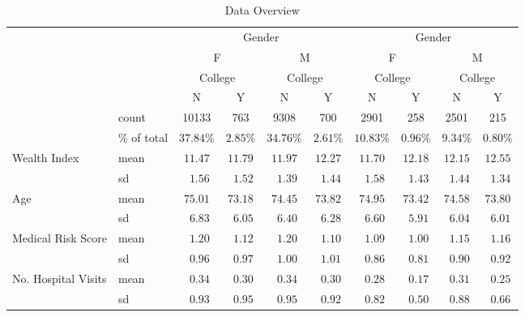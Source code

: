\documentclass[english, 12pt]{article}
\begin{document}
\begin{table}
{\begin{tabular}{llcccccccc}
& & \multicolumn{4}{c}{Gender} & \multicolumn{4}{c}{Gender} \\ \cmidrule(lr){3-6}\cmidrule(lr){7-10}
& & \multicolumn{2}{c}{F} & \multicolumn{2}{c}{M} & \multicolumn{2}{c}{F} & \multicolumn{2}{c}{M} \\ \cmidrule(lr){3-4}\cmidrule(lr){5-6}\cmidrule(lr){7-8}\cmidrule(lr){9-10}
& & \multicolumn{2}{c}{College} & \multicolumn{2}{c}{College} & \multicolumn{2}{c}{College} & \multicolumn{2}{c}{College} \\ \cmidrule(lr){3-4}\cmidrule(lr){5-6}\cmidrule(lr){7-8}\cmidrule(lr){9-10}
 &  & N & Y & N & Y & N & Y & N & \multicolumn{1}{c}{Y} \\ 
\midrule
& count & 10133 & 763 & 9308 & 700 & 2901 & 258 & 2501 & 215 \\
 & \% of total & $37.84\%$ & $2.85\%$ & $34.76\%$ & $2.61\%$ & $10.83\%$ & $0.96\%$ & $9.34\%$ & $0.80\%$ \\
Wealth Index & mean  & $11.47$ & $11.79$ & $11.97$ & $12.27$ & $11.70$ & $12.18$ & $12.15$ & $12.55$ \\
 & sd & $\phantom{0}1.56$ & $\phantom{0}1.52$ & $\phantom{0}1.39$ & $\phantom{0}1.44$ & $\phantom{0}1.58$ & $\phantom{0}1.43$ & $\phantom{0}1.44$ & $\phantom{0}1.34$ \\
Age & mean  & $75.01$ & $73.18$ & $74.45$ & $73.82$ & $74.95$ & $73.42$ & $74.58$ & $73.80$ \\
 & sd  & $\phantom{0}6.83$ & $\phantom{0}6.05$ & $\phantom{0}6.40$ & $\phantom{0}6.28$ & $\phantom{0}6.60$ & $\phantom{0}5.91$ & $\phantom{0}6.04$ & $\phantom{0}6.01$ \\
 Medical Risk Score & mean  & $\phantom{0}1.20$ & $\phantom{0}1.12$ & $\phantom{0}1.20$ & $\phantom{0}1.10$ & $\phantom{0}1.09$ & $\phantom{0}1.00$ & $\phantom{0}1.15$ & $\phantom{0}1.16$ \\
 & sd  & $\phantom{0}0.96$ & $\phantom{0}0.97$ & $\phantom{0}1.00$ & $\phantom{0}1.01$ & $\phantom{0}0.86$ & $\phantom{0}0.81$ & $\phantom{0}0.90$ & $\phantom{0}0.92$ \\
No. Hospital Visits & mean  & $\phantom{0}0.34$ & $\phantom{0}0.30$ & $\phantom{0}0.34$ & $\phantom{0}0.30$ & $\phantom{0}0.28$ & $\phantom{0}0.17$ & $\phantom{0}0.31$ & $\phantom{0}0.25$ \\
 & sd  & $\phantom{0}0.93$ & $\phantom{0}0.95$ & $\phantom{0}0.95$ & $\phantom{0}0.92$ & $\phantom{0}0.82$ & $\phantom{0}0.50$ & $\phantom{0}0.88$ & $\phantom{0}0.66$ \\
\bottomrule 
\end{tabular}
}
    \caption{Data Overview}
    \label{tab:data_overview}
\end{table}
\end{document}
